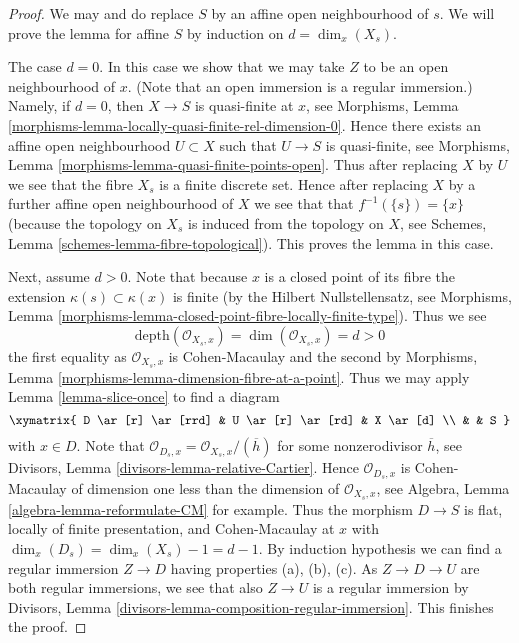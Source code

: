 \begin{proof}
We may and do replace $S$ by an affine open neighbourhood of $s$.
We will prove the lemma for affine $S$ by induction on $d = \dim_x(X_s)$.

\medskip\noindent
The case $d = 0$. In this case we show that we may take $Z$ to be
an open neighbourhood of $x$. (Note that an open immersion is
a regular immersion.) Namely, if $d = 0$, then $X \to S$
is quasi-finite at $x$, see
Morphisms, Lemma \ref{morphisms-lemma-locally-quasi-finite-rel-dimension-0}.
Hence there exists an affine open neighbourhood $U \subset X$ such
that $U \to S$ is quasi-finite, see
Morphisms, Lemma \ref{morphisms-lemma-quasi-finite-points-open}.
Thus after replacing $X$ by $U$ we see that the fibre $X_s$ is a finite
discrete set. Hence after replacing $X$ by a further affine open neighbourhood
of $X$ we see that that $f^{-1}(\{s\}) = \{x\}$ (because the topology
on $X_s$ is induced from the topology on $X$, see
Schemes, Lemma \ref{schemes-lemma-fibre-topological}).
This proves the lemma in this case.

\medskip\noindent
Next, assume $d > 0$. Note that because $x$ is a closed point of its
fibre the extension $\kappa(s) \subset \kappa(x)$ is finite (by the
Hilbert Nullstellensatz, see
Morphisms, Lemma \ref{morphisms-lemma-closed-point-fibre-locally-finite-type}).
Thus we see
$$
\text{depth}(\mathcal{O}_{X_s, x}) = \dim(\mathcal{O}_{X_s, x}) = d > 0
$$
the first equality as $\mathcal{O}_{X_s, x}$ is Cohen-Macaulay and
the second by
Morphisms, Lemma \ref{morphisms-lemma-dimension-fibre-at-a-point}.
Thus we may apply
Lemma \ref{lemma-slice-once}
to find a diagram
$$
\xymatrix{
D \ar[r] \ar[rrd] & U \ar[r] \ar[rd] & X \ar[d] \\
& & S
}
$$
with $x \in D$. Note that
$\mathcal{O}_{D_s, x} = \mathcal{O}_{X_s, x}/(\overline{h})$ for some
nonzerodivisor $\overline{h}$, see
Divisors, Lemma \ref{divisors-lemma-relative-Cartier}.
Hence $\mathcal{O}_{D_s, x}$ is Cohen-Macaulay of dimension
one less than the dimension of $\mathcal{O}_{X_s, x}$, see
Algebra, Lemma \ref{algebra-lemma-reformulate-CM}
for example. Thus the morphism $D \to S$ is flat,
locally of finite presentation, and Cohen-Macaulay at $x$ with
$\dim_x(D_s) = \dim_x(X_s) - 1 = d - 1$. By induction hypothesis
we can find a regular immersion $Z \to D$ having properties (a), (b), (c).
As $Z \to D \to U$ are both regular immersions, we see that also
$Z \to U$ is a regular immersion by
Divisors, Lemma \ref{divisors-lemma-composition-regular-immersion}.
This finishes the proof.
\end{proof}

